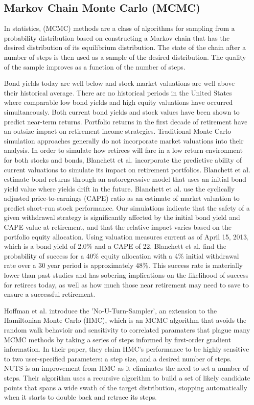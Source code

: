 \subsection{Markov Chain Monte Carlo (MCMC)}

In statistics, (MCMC) methods are a class of algorithms for sampling from a probability distribution based on constructing a Markov chain that has the desired distribution of its equilibrium distribution. The state of the chain after a number of steps is then used as a sample of the desired distribution. The quality of the sample improves as a function of the number of steps.

Bond yields today are well below and stock market valuations are well above their historical average.\cite{Blanchett:2013aa} There are no historical periods in the United States where comparable low bond yields and high equity valuations have occurred simultaneously. Both current bond yields and stock values have been shown to predict near-term returns. Portfolio returns in the first decade of retirement have an outsize impact on retirement income strategies. Traditional Monte Carlo simulation approaches generally do not incorporate market valuations into their analysis. In order to simulate how retirees will fare in a low return environment for both stocks and bonds, Blanchett et al. incorporate the predictive ability of current valuations to simulate its impact on retirement portfolios. Blanchett et al. estimate bond returns through an autoregressive model that uses an initial bond yield value where yields drift in the future. Blanchett et al. use the cyclically adjusted price-to-earnings (CAPE) ratio as an estimate of market valuation to predict short-run stock performance. Our simulations indicate that the safety of a given withdrawal strategy is significantly affected by the initial bond yield and CAPE value at retirement, and that the relative impact varies based on the portfolio equity allocation. Using valuation measures current as of April 15, 2013, which is a bond yield of 2.0\% and a CAPE of 22, Blanchett et al. find the probability of success for a 40\% equity allocation with a 4\% initial withdrawal rate over a 30 year period is approximately 48\%. This success rate is materially lower than past studies and has sobering implications on the likelihood of success for retirees today, as well as how much those near retirement may need to save to ensure a successful retirement.

Hoffman et al. introduce the 'No-U-Turn-Sampler', an extension to the Hamiltonian Monte Carlo (HMC), which is an MCMC algorithm that avoids the random walk behavioir and sensitivity to correlated paramaters that plague many MCMC methods by taking a series of steps informed by first-order gradient information.\cite{Matthew-D.-Hoffman:2014aa} In their paper, they claim HMC’s performance to be highly sensitive to two user-specified parameters: a step size, and a desired number of steps. NUTS is an improvement from HMC as it eliminates the need to set a number of steps. Their algorithm uses a recursive algorithm to build a set of likely candidate points that spans a wide swath of the target distribution, stopping automatically when it starts to double back and retrace its steps.